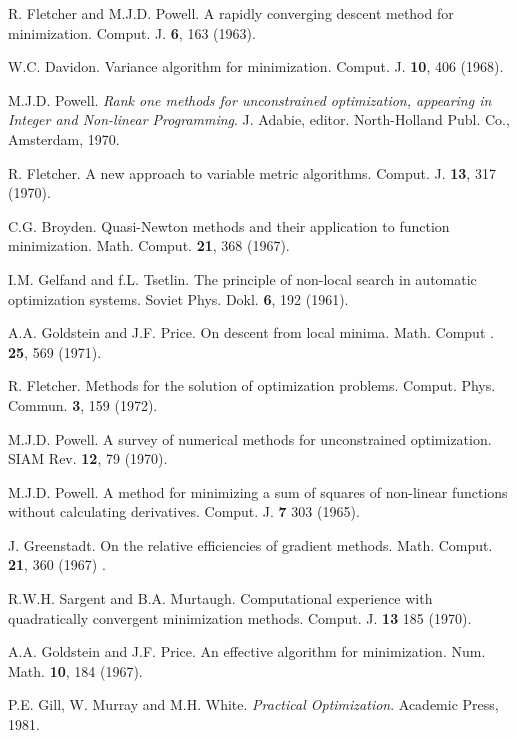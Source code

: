 \begin{thebibliography}{11}
R. Fletcher and M.J.D. Powell. 
A rapidly converging descent method for minimization. 
Comput. J. {\bf 6}, 163 (1963).

W.C. Davidon. 
Variance algorithm for minimization. 
Comput. J. {\bf 10}, 406 (1968).

M.J.D. Powell. 
{\it Rank one methods for unconstrained optimization,
        appearing in Integer and Non-linear Programming}. 
J. Adabie, editor. 
North-Holland Publ. Co., Amsterdam, 1970.

R. Fletcher. 
A new approach to variable metric algorithms.
Comput. J. {\bf 13}, 317 (1970).

C.G. Broyden. 
Quasi-Newton methods and their application to function minimization. 
Math. Comput. {\bf 21}, 368 (1967).

I.M. Gelfand and f.L. Tsetlin. 
The principle of non-local search in automatic optimization systems. 
Soviet Phys. Dokl. {\bf 6}, 192 (1961).

A.A. Goldstein and J.F. Price. 
On descent from local minima. 
Math.  Comput . {\bf 25}, 569 (1971).

R. Fletcher. 
Methods for the solution of optimization problems.
Comput. Phys. Commun. {\bf 3}, 159 (1972).

M.J.D. Powell. 
A survey of numerical methods for unconstrained optimization. 
SIAM Rev. {\bf 12}, 79 (1970).

M.J.D. Powell. 
A method for minimizing a sum of squares of non-linear functions 
           without calculating derivatives. 
Comput. J. {\bf 7} 303 (1965).

J. Greenstadt. 
On the relative efficiencies of gradient methods.
Math. Comput. {\bf 21}, 360 (1967) .

R.W.H. Sargent and B.A. Murtaugh. 
Computational experience with quadratically convergent minimization methods. 
Comput. J. {\bf 13} 185 (1970).

A.A. Goldstein and J.F. Price. 
An effective algorithm for minimization.
Num. Math. {\bf 10}, 184 (1967).

P.E. Gill, W. Murray and M.H. White. 
{\it Practical Optimization}.
Academic Press, 1981.

\end{thebibliography}
